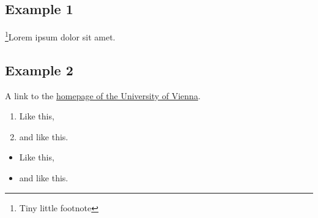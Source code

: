 \documentclass[a4paper, 11pt]{article}          %
\begin{document}
\subsection{Example 1}                          %

    \footnote{Tiny little footnote}Lorem ipsum dolor sit amet.

    \lipsum[1-1]

\subsection{Example 2}                          %

    A link to the \hyperlink{https://www.univie.ac.at}{homepage of the University of Vienna}.
    \lipsum[1-1]
    
    \begin{enumerate}
    \item Like this,
    \item and like this.
    \end{enumerate}
    \begin{itemize}
    \item Like this,
    \item and like this.
    \end{itemize}
    
    \lipsum[1-1]

\end{document}
